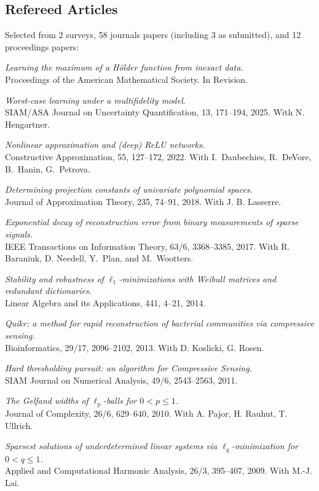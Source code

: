 \documentclass[11pt]{article}
\begin{document}
\subsection{Refereed Articles}
Selected from 2 surveys, 58 journals papers (including 3 as submitted), and 12 proceedings papers:
\betaremune
\item {\sl Learning the maximum of a H\"older function from inexact data}.\\
Proceedings of the American Mathematical Society.
In Revision.
\item {\sl Worst-case learning under a multifidelity model}.\\
SIAM/ASA Journal on Uncertainty Quantification, 13, 171--194, 2025. With N. Hengartner.
\item {\sl Nonlinear approximation and (deep) ReLU networks.}\\
Constructive Approximation,  55, 127--172, 2022.
With I.~Daubechies, R.~DeVore, B.~Hanin, G.~Petrova.
\item {\sl Determining projection constants of univariate polynomial spaces}.\\
Journal of Approximation Theory, 235, 74--91, 2018.
With J. B. Lasserre.
\item {\sl Exponential decay of reconstruction error from binary measurements of sparse signals.}\\
IEEE Transactions on Information Theory, 63/6, 3368--3385, 2017.
With R. Baraniuk, D. Needell, Y.~Plan, and \mbox{M.~Wootters}.
\item {\sl Stability and robustness of $\ell_1$-minimizations with Weibull matrices and redundant dictionaries.}\\
Linear Algebra and its Applications, 441, 4--21, 2014.
\item {\sl Quikr: a method for rapid reconstruction of bacterial communities via compressive sensing.}\\
Bioinformatics, 29/17, 2096--2102, 2013. 
With D. Koslicki, G. Rosen.
\item {\sl Hard thresholding pursuit: an algorithm for Compressive Sensing.}\\
SIAM Journal on Numerical Analysis, 49/6, 2543--2563, 2011.
\item {\sl The Gelfand widths of $\ell_p$-balls for $0<p \le 1$.}\\
Journal of Complexity, 26/6, 629--640, 2010. 
With A. Pajor, H. Rauhut, T. Ullrich.
\item {\sl  Sparsest solutions of underdetermined linear systems via $\ell_q$-minimization for $0 <  q  \le  1$.}\\
Applied and Computational Harmonic Analysis, 26/3, 395--407, 2009. 
With M.-J. Lai.
\eetaremune
\end{document}
